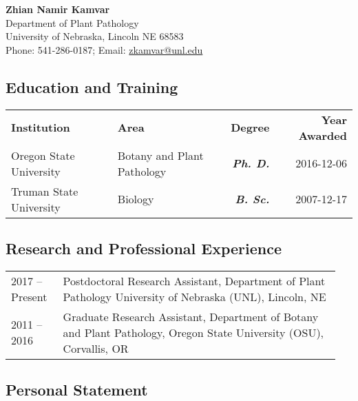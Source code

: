 \documentclass[12pt,letterpaper]{article}
\title{\ruleline{Biographical Sketch}}
\begin{document}
\maketitle

\begin{center}
{\bf Zhian Namir Kamvar}\\
Department of Plant Pathology \\
University of Nebraska, Lincoln NE 68583\\
Phone: 541-286-0187; Email: \href{mailto:zkamvar@unl.edu}{zkamvar@unl.edu}
\end{center}

\subsection*{Education and Training}  

\begin{center}
\begin{tabular}{llrr}%
\textbf{Institution} & \textbf{Area} & \textbf{Degree} & \textbf{Year Awarded}\\
Oregon State University & Botany and Plant Pathology & \textit{\textbf{Ph. D.}} & 2016-12-06\\
Truman State University & Biology  & \textit{\textbf{B. Sc.}} &  2007-12-17
\end{tabular}
\end{center}



\subsection*{Research and Professional Experience}

\begin{tabular}{p{0.15\linewidth}p{0.8\linewidth}}
2017 --	Present & Postdoctoral Research Assistant, Department of Plant Pathology 
			      University of Nebraska (UNL), Lincoln, NE\\
2011 -- 2016    & Graduate Research Assistant, Department of Botany and Plant 
                  Pathology, Oregon State University (OSU), Corvallis, OR
\end{tabular}

\subsection*{Personal Statement}
\end{document}
